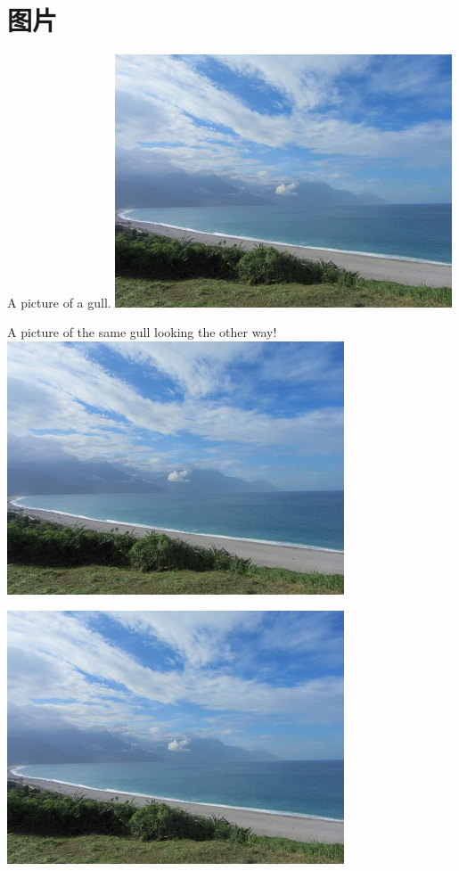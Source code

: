 \clearpage
\section{图片}

\begin{Figure}{A picture of a gull.}
    \includegraphics[width=0.75\textwidth]{./contents/test.jpg}
\end{Figure}

\begin{Figure}{A picture of the same gull looking the other way!}
    \includegraphics[width=0.75\textwidth]{./contents/test.jpg}
\end{Figure}

\begin{Figure}{}
    \includegraphics[width=0.75\textwidth]{./contents/test.jpg}
\end{Figure}

